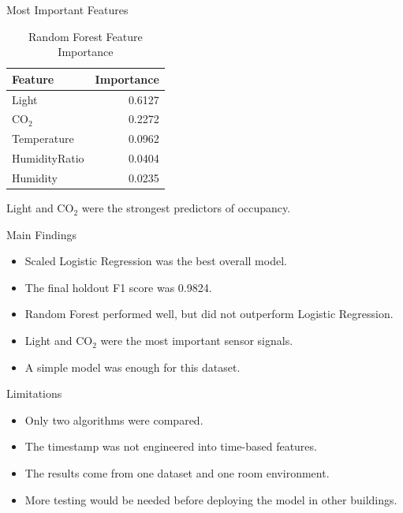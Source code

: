 \documentclass[aspectratio=169,11pt]{beamer}
\begin{document}
\begin{frame}{Most Important Features}
    \begin{table}
        \centering
        \caption{Random Forest Feature Importance}
        \begin{tabular}{lr}
            \toprule
            Feature & Importance \\
            \midrule
            Light & 0.6127 \\
            CO$_2$ & 0.2272 \\
            Temperature & 0.0962 \\
            HumidityRatio & 0.0404 \\
            Humidity & 0.0235 \\
            \bottomrule
        \end{tabular}
    \end{table}

    \vspace{0.2cm}
    Light and CO$_2$ were the strongest predictors of occupancy.
\end{frame}

\begin{frame}{Main Findings}
    \begin{itemize}
        \item Scaled Logistic Regression was the best overall model.
        \item The final holdout F1 score was 0.9824.
        \item Random Forest performed well, but did not outperform Logistic Regression.
        \item Light and CO$_2$ were the most important sensor signals.
        \item A simple model was enough for this dataset.
    \end{itemize}
\end{frame}

\begin{frame}{Limitations}
    \begin{itemize}
        \item Only two algorithms were compared.
        \item The timestamp was not engineered into time-based features.
        \item The results come from one dataset and one room environment.
        \item More testing would be needed before deploying the model in other buildings.
    \end{itemize}
\end{frame}
\end{document}
